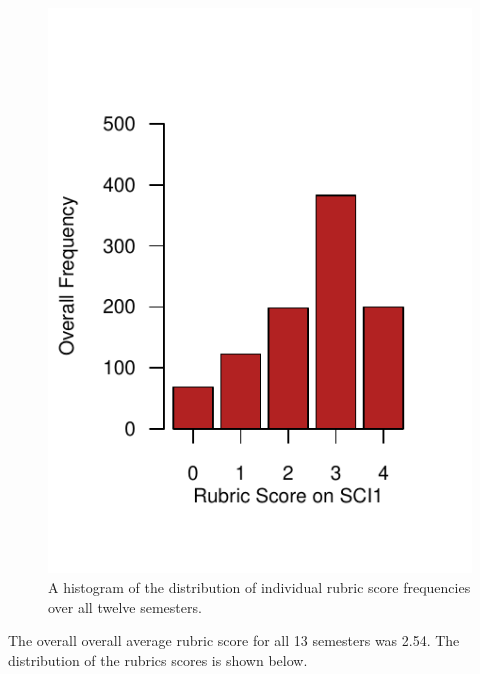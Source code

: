 \documentclass[fleqn,10pt]{SelfArx}\usepackage[]{graphicx}\usepackage[]{color}
\begin{document}
\begin{figure}[h]\centering

\includegraphics[width=\columnwidth,viewport = 0 20 216 240]{./figure/histogram}
\protect\caption{A histogram of the distribution of individual rubric score frequencies over all twelve semesters.}
\label{fig:histogram}
\end{figure}

The overall overall average rubric score for all 13 semesters was 2.54. The distribution of the rubrics scores is shown below.
\end{document}
